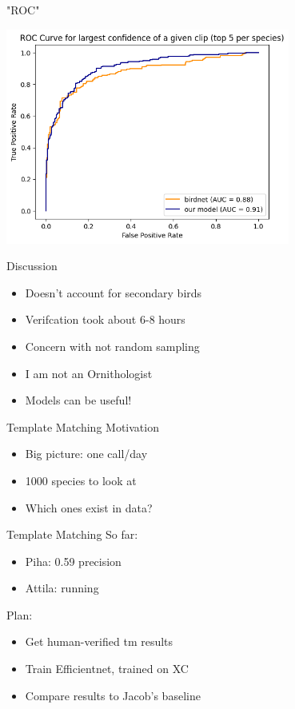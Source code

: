 \begin{frame}{"ROC"}

    \centering
    \includegraphics[height=0.7\textheight,width=0.7\textwidth,keepaspectratio]{./images/roc.png}

\end{frame}

\begin{frame}{Discussion}
    \begin{itemize}
        \item Doesn't account for secondary birds
        \item Verifcation took about 6-8 hours
        \item Concern with not random sampling
        \item I am not an Ornithologist
        \item Models can be useful!
    \end{itemize}
\end{frame}

\begin{frame}{Template Matching Motivation}
    \begin{itemize}
        \item Big picture: one call/day
        \item 1000 species to look at
        \item Which ones exist in data?
    \end{itemize}
\end{frame}

\begin{frame}{Template Matching}
    So far:
    \begin{itemize}
        \item Piha: 0.59 precision
        \item Attila: running
    \end{itemize}
    Plan:
    \begin{itemize}
        \item Get human-verified tm results
        \item Train Efficientnet, trained on XC
        \item Compare results to Jacob's baseline
    \end{itemize}
\end{frame}